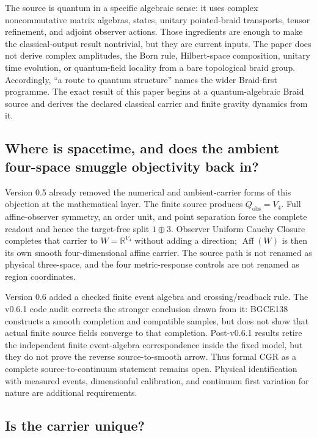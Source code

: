 \documentclass[11pt]{article}
\theoremstyle{definition}
\theoremstyle{remark}
\begin{document}
The source is quantum in a specific algebraic sense: it uses complex noncommutative matrix algebras, states, unitary pointed-braid transports, tensor refinement, and adjoint observer actions. Those ingredients are enough to make the classical-output result nontrivial, but they are current inputs. The paper does not derive complex amplitudes, the Born rule, Hilbert-space composition, unitary time evolution, or quantum-field locality from a bare topological braid group. Accordingly, ``a route to quantum structure'' names the wider Braid-first programme. The exact result of this paper begins at a quantum-algebraic Braid source and derives the declared classical carrier and finite gravity dynamics from it.

\subsection{Where is spacetime, and does the ambient four-space smuggle objectivity back in?}

Version 0.5 already removed the numerical and ambient-carrier forms of this objection at the mathematical layer. The finite source produces $Q_{\mathrm{obs}}=V_4$. Full affine-observer symmetry, an order unit, and point separation force the complete readout and hence the target-free split $1\oplus3$. Observer Uniform Cauchy Closure completes that carrier to $W=\mathbb R^{V_4}$ without adding a direction; $\operatorname{Aff}(W)$ is then its own smooth four-dimensional affine carrier. The source path is not renamed as physical three-space, and the four metric-response controls are not renamed as region coordinates.

Version 0.6 added a checked finite event algebra and crossing/readback rule. The v0.6.1 code audit corrects the stronger conclusion drawn from it: BGCE138 constructs a smooth completion and compatible samples, but does not show that actual finite source fields converge to that completion. Post-v0.6.1 results retire the independent finite event-algebra correspondence inside the fixed model, but they do not prove the reverse source-to-smooth arrow. Thus formal CGR as a complete source-to-continuum statement remains open. Physical identification with measured events, dimensionful calibration, and continuum first variation for nature are additional requirements.

\subsection{Is the carrier unique?}
\end{document}
